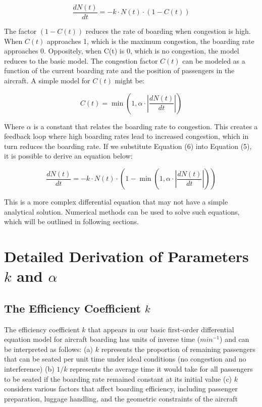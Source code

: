 \documentclass[12pt]{article}
\begin{document}
\begin{equation}
\frac{dN(t)}{dt} = -k \cdot N(t) \cdot (1 - C(t))
\end{equation}

The factor $(1 - C(t))$ reduces the rate of boarding when congestion is high. When $C(t)$ approaches 1, which is the maximum congestion, the boarding rate approaches 0. Oppositely, when C(t) is 0, which is no congestion, the model reduces to the basic model. The congestion factor $C(t)$ can be modeled as a function of the current boarding rate and the position of passengers in the aircraft. A simple model for $C(t)$ might be:

\begin{equation}
C(t) = \min\left(1, \alpha \cdot \left|\frac{dN(t)}{dt}\right|\right)
\end{equation}

Where $\alpha$ is a constant that relates the boarding rate to congestion. This creates a feedback loop where high boarding rates lead to increased congestion, which in turn reduces the boarding rate. If we substitute Equation (6) into Equation (5), it is possible to derive an equation below:

\begin{equation}
\frac{dN(t)}{dt} = -k \cdot N(t) \cdot \left(1 - \min\left(1, \alpha \cdot \left|\frac{dN(t)}{dt}\right|\right)\right)
\end{equation}

This is a more complex differential equation that may not have a simple analytical solution. Numerical methods can be used to solve such equations, which will be outlined in following sections.

\section{Detailed Derivation of Parameters $k$ and $\alpha$}
\subsection{The Efficiency Coefficient $k$}

The efficiency coefficient $k$ that appears in our basic first-order differential equation model for aircraft boarding has units of inverse time ($min^{-1}$) and can be interpreted as follows: (a) $k$ represents the proportion of remaining passengers that can be seated per unit time under ideal conditions (no congestion and no interference) (b) $1/k$ represents the average time it would take for all passengers to be seated if the boarding rate remained constant at its initial value (c) $k$ considers various factors that affect boarding efficiency, including passenger preparation, luggage handling, and the geometric constraints of the aircraft
\end{document}
